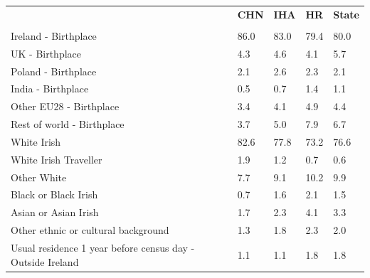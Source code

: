\documentclass{article}
\begin{document}
\pagebreak
\begin{table}[h]	
\centering
		\begin{tabular}{KTTTT}
  \hline
& \textbf{CHN} & \textbf{IHA} & \textbf{HR}& \textbf{State}\\ 
  \hline
    \\ 
    \hline
Ireland - Birthplace & 86.0& 83.0& 79.4& 80.0\\
UK - Birthplace & 4.3& 4.6& 4.1& 5.7\\
Poland - Birthplace & 2.1& 2.6& 2.3& 2.1\\
India - Birthplace & 0.5& 0.7& 1.4& 1.1\\
Other EU28 - Birthplace & 3.4& 4.1& 4.9& 4.4\\
Rest of world - Birthplace & 3.7& 5.0& 7.9& 6.7\\
    \hline
White Irish & 82.6& 77.8& 73.2& 76.6\\
White Irish Traveller & 1.9& 1.2& 0.7& 0.6\\
Other White &  7.7&  9.1& 10.2&  9.9\\
Black or Black Irish & 0.7& 1.6& 2.1& 1.5\\
Asian or Asian Irish & 1.7& 2.3& 4.1& 3.3\\
Other ethnic or cultural background & 1.3& 1.8& 2.3& 2.0\\
    \hline
Usual residence 1 year before census day - Outside Ireland & 1.1& 1.1& 1.8& 1.8\\


\end{tabular}
\end{table}
\end{document}
